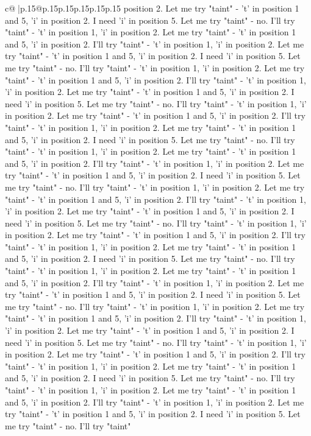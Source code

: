 \documentclass{article}
\begin{document}
{\begin{supertabular}{c@{$\;$}|p{.15\linewidth}@{}p{.15\linewidth}p{.15\linewidth}p{.15\linewidth}p{.15\linewidth}p{.15\linewidth}}
{{{position 2. Let me try "taint" {-} 't' in position 1 and 5, 'i' in position 2. I need 'i' in position 5. Let me try "taint" {-} no. I'll try "taint" {-} 't' in position 1, 'i' in position 2. Let me try "taint" {-} 't' in position 1 and 5, 'i' in position 2. I'll try "taint" {-} 't' in position 1, 'i' in position 2. Let me try "taint" {-} 't' in position 1 and 5, 'i' in position 2. I need 'i' in position 5. Let me try "taint" {-} no. I'll try "taint" {-} 't' in position 1, 'i' in position 2. Let me try "taint" {-} 't' in position 1 and 5, 'i' in position 2. I'll try "taint" {-} 't' in position 1, 'i' in position 2. Let me try "taint" {-} 't' in position 1 and 5, 'i' in position 2. I need 'i' in position 5. Let me try "taint" {-} no. I'll try "taint" {-} 't' in position 1, 'i' in position 2. Let me try "taint" {-} 't' in position 1 and 5, 'i' in position 2. I'll try "taint" {-} 't' in position 1, 'i' in position 2. Let me try "taint" {-} 't' in position 1 and 5, 'i' in position 2. I need 'i' in position 5. Let me try "taint" {-} no. I'll try "taint" {-} 't' in position 1, 'i' in position 2. Let me try "taint" {-} 't' in position 1 and 5, 'i' in position 2. I'll try "taint" {-} 't' in position 1, 'i' in position 2. Let me try "taint" {-} 't' in position 1 and 5, 'i' in position 2. I need 'i' in position 5. Let me try "taint" {-} no. I'll try "taint" {-} 't' in position 1, 'i' in position 2. Let me try "taint" {-} 't' in position 1 and 5, 'i' in position 2. I'll try "taint" {-} 't' in position 1, 'i' in position 2. Let me try "taint" {-} 't' in position 1 and 5, 'i' in position 2. I need 'i' in position 5. Let me try "taint" {-} no. I'll try "taint" {-} 't' in position 1, 'i' in position 2. Let me try "taint" {-} 't' in position 1 and 5, 'i' in position 2. I'll try "taint" {-} 't' in position 1, 'i' in position 2. Let me try "taint" {-} 't' in position 1 and 5, 'i' in position 2. I need 'i' in position 5. Let me try "taint" {-} no. I'll try "taint" {-} 't' in position 1, 'i' in position 2. Let me try "taint" {-} 't' in position 1 and 5, 'i' in position 2. I'll try "taint" {-} 't' in position 1, 'i' in position 2. Let me try "taint" {-} 't' in position 1 and 5, 'i' in position 2. I need 'i' in position 5. Let me try "taint" {-} no. I'll try "taint" {-} 't' in position 1, 'i' in position 2. Let me try "taint" {-} 't' in position 1 and 5, 'i' in position 2. I'll try "taint" {-} 't' in position 1, 'i' in position 2. Let me try "taint" {-} 't' in position 1 and 5, 'i' in position 2. I need 'i' in position 5. Let me try "taint" {-} no. I'll try "taint" {-} 't' in position 1, 'i' in position 2. Let me try "taint" {-} 't' in position 1 and 5, 'i' in position 2. I'll try "taint" {-} 't' in position 1, 'i' in position 2. Let me try "taint" {-} 't' in position 1 and 5, 'i' in position 2. I need 'i' in position 5. Let me try "taint" {-} no. I'll try "taint" {-} 't' in position 1, 'i' in position 2. Let me try "taint" {-} 't' in position 1 and 5, 'i' in position 2. I'll try "taint" {-} 't' in position 1, 'i' in position 2. Let me try "taint" {-} 't' in position 1 and 5, 'i' in position 2. I need 'i' in position 5. Let me try "taint" {-} no. I'll try "taint" }}}
\end{supertabular}}
\end{document}
